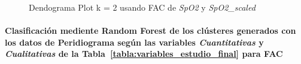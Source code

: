 \begin{figure}[ht]
    \centering
    \hfill
    \caption{Dendograma Plot k = 2 usando FAC de \textit{SpO2} y \textit{SpO2\_scaled}}\label{fig:acf_ctg_spo2}
\end{figure}

\paragraph{Clasificación mediente Random Forest de los clústeres generados con los datos de Peridiograma según las variables \textit{Cuantitativas} y \textit{Cualitativas} de la Tabla~\ref{tabla:variables_estudio_final} para FAC}

